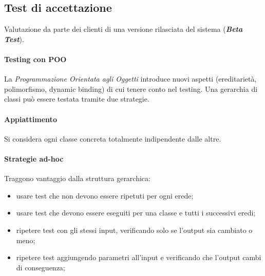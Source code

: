 \subsection{Test di accettazione} Valutazione da parte dei clienti di una versione rilasciata del sistema (\textbf{\textit{Beta Test}}).

\newpage

\paragraph{Testing con POO}

La \textit{Programmazione Orientata agli Oggetti} introduce nuovi aspetti (ereditarietà, polimorfismo, dynamic binding) di cui tenere conto nel testing. Una gerarchia di classi può essere testata tramite due strategie.

\paragraph{Appiattimento}  Si considera ogni classe concreta totalmente indipendente dalle altre.

\paragraph{Strategie ad-hoc} Traggono vantaggio dalla struttura gerarchica:
\begin{itemize}
    \item usare test che non devono essere ripetuti per ogni erede;
    \item usare test che devono essere eseguiti per una classe e tutti i successivi eredi;
    \item ripetere test con gli stessi input, verificando solo se l'output sia cambiato o meno;
    \item ripetere test aggiungendo parametri all'input e verificando che l'output cambi di conseguenza; 
\end{itemize}

\newpage
